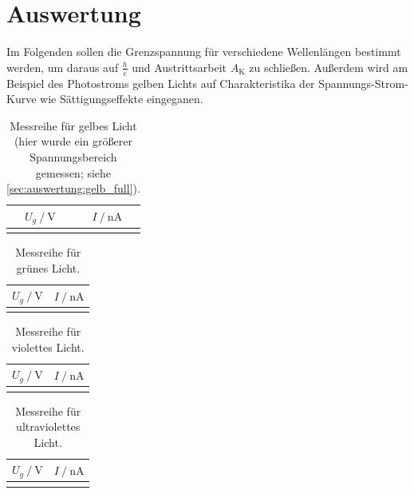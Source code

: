 \section{Auswertung} \label{sec:auswertung}

Im Folgenden sollen die Grenzspannung für verschiedene Wellenlängen bestimmt werden,
um daraus auf $\frac{h}{e}$ und Austrittsarbeit $A_\text{K}$ zu schließen.
Außerdem wird am Beispiel des Photostroms gelben Lichts
auf Charakteristika der Spannungs-Strom-Kurve wie Sättigungseffekte eingeganen.

\begin{table}
  \centering
  \caption{Messreihe für gelbes Licht (hier wurde ein größerer Spannungsbereich gemessen; siehe \autoref{sec:auswertung:gelb_full}).}
  \label{tab:werte_gelb}
  \begin{tabular}{S S}
  \toprule
  $U_g \mathbin{/} \si{\volt}$ &
  $I \mathbin{/} \si{\nano\ampere}$ \\
  \midrule
  \bottomrule
  \end{tabular}
\end{table}

\begin{table}
  \centering
  \caption{Messreihe für grünes Licht.}
  \label{tab:werte_gruen}
  \begin{tabular}{S S}
  \toprule
  $U_g \mathbin{/} \si{\volt}$ &
  $I \mathbin{/} \si{\nano\ampere}$ \\
  \midrule
  \bottomrule
  \end{tabular}
\end{table}

\begin{table}
  \centering
  \caption{Messreihe für violettes Licht.}
  \label{tab:werte_violett}
  \begin{tabular}{S S}
  \toprule
  $U_g \mathbin{/} \si{\volt}$ &
  $I \mathbin{/} \si{\nano\ampere}$ \\
  \midrule
  \bottomrule
  \end{tabular}
\end{table}

\begin{table}
  \centering
  \caption{Messreihe für ultraviolettes Licht.}
  \label{tab:werte_ultraviolett}
  \begin{tabular}{S S}
  \toprule
  $U_g \mathbin{/} \si{\volt}$ &
  $I \mathbin{/} \si{\nano\ampere}$ \\
  \midrule
  \bottomrule
  \end{tabular}
\end{table}

